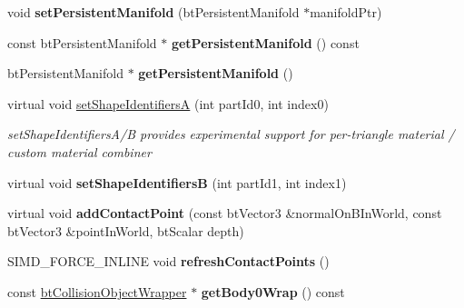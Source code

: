 \begin{DoxyCompactItemize}
void {\bfseries set\+Persistent\+Manifold} (bt\+Persistent\+Manifold $\ast$manifold\+Ptr)
\item 
\mbox{\label{classbtManifoldResult_a222d8b2a5ee129b2c0bcad2eaa01d3ed}} 
const bt\+Persistent\+Manifold $\ast$ {\bfseries get\+Persistent\+Manifold} () const
\item 
\mbox{\label{classbtManifoldResult_a4e02b9721e32500c1af01fb775edf14e}} 
bt\+Persistent\+Manifold $\ast$ {\bfseries get\+Persistent\+Manifold} ()
\item 
\mbox{\label{classbtManifoldResult_a01f472fc7b6d431845d22f55842f029d}} 
virtual void \hyperlink{classbtManifoldResult_a01f472fc7b6d431845d22f55842f029d}{set\+Shape\+IdentifiersA} (int part\+Id0, int index0)
\begin{DoxyCompactList}\small\item\em set\+Shape\+Identifiers\+A/B provides experimental support for per-\/triangle material / custom material combiner \end{DoxyCompactList}\item 
\mbox{\label{classbtManifoldResult_a95a5dab38f08b08af1feb6756d60a681}} 
virtual void {\bfseries set\+Shape\+IdentifiersB} (int part\+Id1, int index1)
\item 
\mbox{\label{classbtManifoldResult_a7af5985689311d88c5e0c79745c984ef}} 
virtual void {\bfseries add\+Contact\+Point} (const bt\+Vector3 \&normal\+On\+B\+In\+World, const bt\+Vector3 \&point\+In\+World, bt\+Scalar depth)
\item 
\mbox{\label{classbtManifoldResult_adbcfd865252ac9dc8a3543f404e2dcf1}} 
S\+I\+M\+D\+\_\+\+F\+O\+R\+C\+E\+\_\+\+I\+N\+L\+I\+NE void {\bfseries refresh\+Contact\+Points} ()
\item 
\mbox{\label{classbtManifoldResult_a3ffec9c15260f1a8c22ace0cd2b52d75}} 
const \hyperlink{structbtCollisionObjectWrapper}{bt\+Collision\+Object\+Wrapper} $\ast$ {\bfseries get\+Body0\+Wrap} () const
\item 
\mbox{\label{classbtManifoldResult_a140127f80ee0efb8a8301a6a0c7c304c}} 

\end{DoxyCompactItemize}
